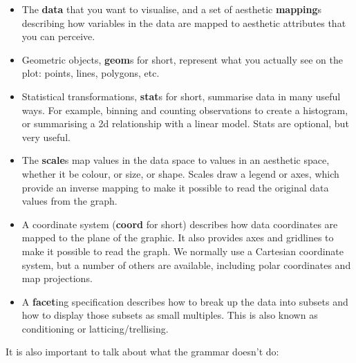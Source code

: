 \begin{itemize}
  \item The \textbf{data} that you want to visualise, and a set of aesthetic \textbf{mapping}s describing how variables in the data are mapped to aesthetic attributes that you can perceive.

  \item Geometric objects, \textbf{geom}s for short, represent what you actually see on the plot: points, lines, polygons, etc.

  \item Statistical transformations, \textbf{stat}s for short, summarise data in many useful ways.  For example, binning and counting observations to create a histogram, or summarising a 2d relationship with a linear model.  Stats are optional, but very useful.

  \item The \textbf{scale}s map values in the data space to values in an aesthetic space, whether it be colour, or size, or shape.  Scales draw a legend or axes, which provide an inverse mapping to make it possible to read the original data values from the graph.

  \item A coordinate system (\textbf{coord} for short) describes how data coordinates are mapped to the plane of the graphic.  It also provides axes and gridlines to make it possible to read the graph.  We normally use a Cartesian coordinate system, but a number of others are available, including polar coordinates and map projections.

  \item A \textbf{facet}ing specification describes how to break up the data into subsets and how to display those subsets as small multiples.  This is also known as conditioning or latticing/trellising.

\end{itemize}

It is also important to talk about what the grammar doesn't do:

